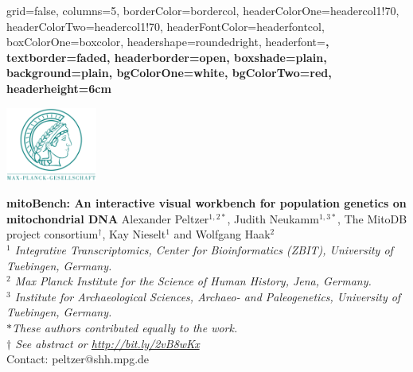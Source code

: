 \documentclass[a0paper,portrait]{baposter}
\begin{document}

\begin{poster}{
	grid=false,
	columns=5,
	borderColor=bordercol,
	headerColorOne=headercol1!70,%
	headerColorTwo=headercol1!70,%
	headerFontColor=headerfontcol,
	boxColorOne=boxcolor,
	headershape=roundedright,
	headerfont=\large\sf\bf,
	textborder=faded,%
	headerborder=open,
  	boxshade=plain,
	background=plain,
	bgColorOne=white,
	bgColorTwo=red,
	headerheight=6cm
}
{

	\includegraphics[width=3cm]{figures/Max-Planck-Gesellschaft.png}

}
{\Large\bf
	mitoBench: An interactive visual workbench for population genetics on mitochondrial DNA
}
{
	\vspace{1em} Alexander Peltzer$^{1,2*}$, Judith Neukamm$^{1,3*}$, The MitoDB project consortium$^\dagger$, Kay Nieselt$^{1}$ and Wolfgang Haak$^{2}$\\
	{\footnotesize \textit{$^1$ Integrative Transcriptomics, Center for Bioinformatics (ZBIT), University of Tuebingen, Germany.\\
	$^2$ Max Planck Institute for the Science of Human History, Jena, Germany.\\
	$^3$ Institute for Archaeological Sciences, Archaeo- and Paleogenetics, University of Tuebingen, Germany.\\
	$*$These authors contributed equally to the work. \\
	$\dagger$ See abstract or \url{http://bit.ly/2vB8wKx}}\\
	\vspace{1em}
	Contact: peltzer@shh.mpg.de
	}
}
{

}
\end{poster}
\end{document}
